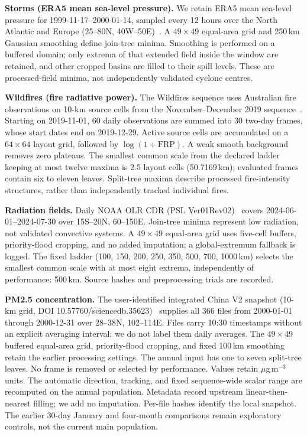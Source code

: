 \textbf{Storms (ERA5 mean sea-level pressure).} We retain ERA5 mean sea-level pressure for 1999-11-17--2000-01-14, sampled every 12 hours over the North Atlantic and Europe (25--80\textdegree N, 40\textdegree W--50\textdegree E)~\cite{Hersbach:2020:ERA5}. A $49\times49$ equal-area grid and 250\,km Gaussian smoothing define join-tree minima. Smoothing is performed on a buffered domain; only extrema of that extended field inside the window are retained, and other cropped basins are filled to their spill levels. These are processed-field minima, not independently validated cyclone centres.

\textbf{Wildfires (fire radiative power).} The Wildfires sequence uses Australian fire observations on 10-km source cells from the November--December 2019 sequence~\cite{Franke:2021:1DP}. Starting on 2019-11-01, 60 daily observations are summed into 30 two-day frames, whose start dates end on 2019-12-29. Active source cells are accumulated on a $64\times64$ layout grid, followed by $\log(1+\mathrm{FRP})$. A weak smooth background removes zero plateaus. The smallest common scale from the declared ladder keeping at most twelve maxima is 2.5 layout cells (50.7169\,km); evaluated frames contain six to eleven leaves. Split-tree maxima describe processed fire-intensity structures, rather than independently tracked individual fires.

\textbf{Radiation fields.} Daily NOAA OLR CDR (PSL Ver01Rev02)~\cite{NOAA:OLR} covers 2024-06-01--2024-07-30 over 15\textdegree S--20\textdegree N, 60--150\textdegree E. Join-tree minima represent low radiation, not validated convective systems. A $49\times49$ equal-area grid uses five-cell buffers, priority-flood cropping, and no added imputation; a global-extremum fallback is logged. The fixed ladder (100, 150, 200, 250, 350, 500, 700, 1000\,km) selects the smallest common scale with at most eight extrema, independently of performance: 500\,km. Source hashes and preprocessing trials are recorded.

\textbf{PM2.5 concentration.} The user-identified integrated China V2 snapshot (10-km grid, DOI 10.57760/sciencedb.35623)~\cite{Dong:2026:PM25} supplies all 366 files from 2000-01-01 through 2000-12-31 over 28--38\textdegree N, 102--114\textdegree E. Files carry 10:30 timestamps without an explicit averaging interval; we do not label them daily averages. The $49\times49$ buffered equal-area grid, priority-flood cropping, and fixed 100\,km smoothing retain the earlier processing settings. The annual input has one to seven split-tree leaves. No frame is removed or selected by performance. Values retain $\mu$g\,m$^{-3}$ units. The automatic direction, tracking, and fixed sequence-wide scalar range are recomputed on the annual population. Metadata record upstream linear-then-nearest filling; we add no imputation. Per-file hashes identify the local snapshot. The earlier 30-day January and four-month comparisons remain exploratory controls, not the current main population.

